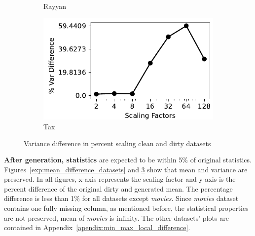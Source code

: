 \begin{figure}[!t]
\begin{subfigure}{0.32\textwidth}
    \caption{Rayyan}
    \label{exp:var_rayyan}
\end{subfigure}
\hfill
\begin{subfigure}{0.32\textwidth}
    \includegraphics[width=\textwidth]{figures/plot/var/variance_diff_tax.pdf}
    \caption{Tax}
    \label{exp:var_tax}
\end{subfigure}
\hfill
\caption{Variance difference in percent scaling clean and dirty datasets}
\label{exp:var_difference_datasets}
\end{figure}


\textbf{After generation, statistics} are expected to be within 5\% of original statistics.
Figures~\ref{exp:mean_difference_datasets} and \ref{exp:var_difference_datasets} show that mean and variance are preserved.
In all figures, x-axis represents the scaling factor and y-axis is the percent difference of the original dirty and generated mean.
The percentage difference is less than 1\% for all datasets except \textit{movies}.
Since \textit{movies} dataset contains one fully missing column, as mentioned before, the statistical properties are not preserved, mean of \textit{movies} is infinity. 
The other datasets' plots are contained in Appendix~\ref{apendix:min_max_local_difference}.
